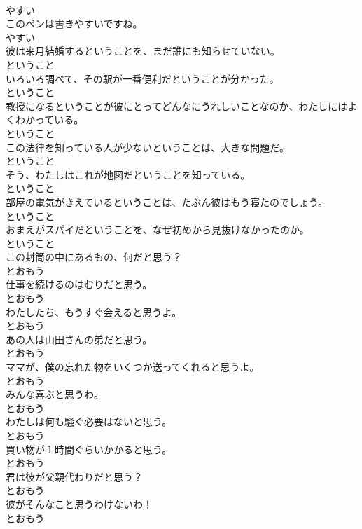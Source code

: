 \documentclass[8pt]{extreport}
\begin{document}
\begin{CJK}{UTF8}{min}
\\	やすい
\\	このペンは書きやすいですね。	
\\	やすい
\\	彼は来月結婚するということを、まだ誰にも知らせていない。	
\\	ということ
\\	いろいろ調べて、その駅が一番便利だということが分かった。	
\\	ということ
\\	教授になるということが彼にとってどんなにうれしいことなのか、わたしにはよくわかっている。	
\\	ということ
\\	この法律を知っている人が少ないということは、大きな問題だ。	
\\	ということ
\\	そう、わたしはこれが地図だということを知っている。	
\\	ということ
\\	部屋の電気がきえているということは、たぶん彼はもう寝たのでしょう。	
\\	ということ
\\	おまえがスパイだということを、なぜ初めから見抜けなかったのか。	
\\	ということ
\\	この封筒の中にあるもの、何だと思う？	
\\	とおもう
\\	仕事を続けるのはむりだと思う。	
\\	とおもう
\\	わたしたち、もうすぐ会えると思うよ。	
\\	とおもう
\\	あの人は山田さんの弟だと思う。	
\\	とおもう
\\	ママが、僕の忘れた物をいくつか送ってくれると思うよ。	
\\	とおもう
\\	みんな喜ぶと思うわ。	
\\	とおもう
\\	わたしは何も騒ぐ必要はないと思う。	
\\	とおもう
\\	買い物が１時間ぐらいかかると思う。	
\\	とおもう
\\	君は彼が父親代わりだと思う？	
\\	とおもう
\\	彼がそんなこと思うわけないわ！	
\\	とおもう

\end{CJK}
\end{document}
